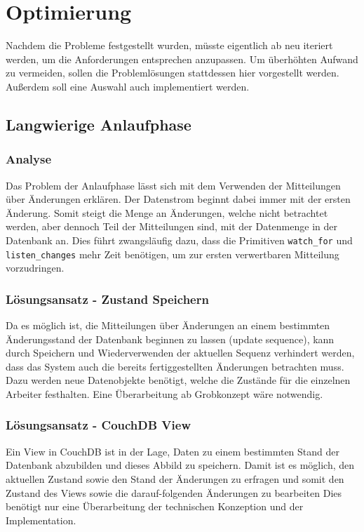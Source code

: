 \chapter{Optimierung}
\label{cha:opt}
Nachdem die Probleme festgestellt wurden,
müsste eigentlich ab  neu iteriert werden,
um die Anforderungen entsprechen anzupassen.
Um überhöhten Aufwand zu vermeiden,
sollen die Problemlösungen stattdessen hier vorgestellt werden.
Außerdem soll eine Auswahl auch implementiert werden.

\section{Langwierige Anlaufphase}
\label{cha:opt:anlaufphase}
\subsection{Analyse}

Das Problem der Anlaufphase lässt sich mit dem Verwenden der Mitteilungen über Änderungen erklären. Der Datenstrom beginnt dabei immer mit der ersten Änderung.
Somit steigt die Menge an Änderungen, welche nicht betrachtet werden, aber dennoch Teil der Mitteilungen sind, mit der Datenmenge in der Datenbank an.
Dies führt zwangsläufig dazu, dass die Primitiven \verb|watch_for| und \verb|listen_changes| mehr Zeit benötigen, um zur ersten verwertbaren Mitteilung vorzudringen.


\subsection{Lösungsansatz - Zustand Speichern}

Da es möglich ist, die Mitteilungen über Änderungen an einem bestimmten Änderungsstand der Datenbank beginnen zu lassen (update sequence),
kann durch Speichern und Wiederverwenden der aktuellen Sequenz verhindert werden,
dass das System auch die bereits fertiggestellten Änderungen betrachten muss.
Dazu werden neue Datenobjekte benötigt, welche die Zustände für die einzelnen Arbeiter festhalten. Eine Überarbeitung ab Grobkonzept wäre notwendig.


\subsection{Lösungsansatz - CouchDB View}

Ein View in CouchDB ist in der Lage, Daten zu einem bestimmten Stand der Datenbank abzubilden und dieses Abbild zu speichern.
Damit ist es möglich, den aktuellen Zustand sowie den Stand der Änderungen zu erfragen und somit den Zustand des Views sowie die darauf-folgenden Änderungen zu bearbeiten 
Dies benötigt nur eine Überarbeitung der technischen Konzeption und der Implementation.

